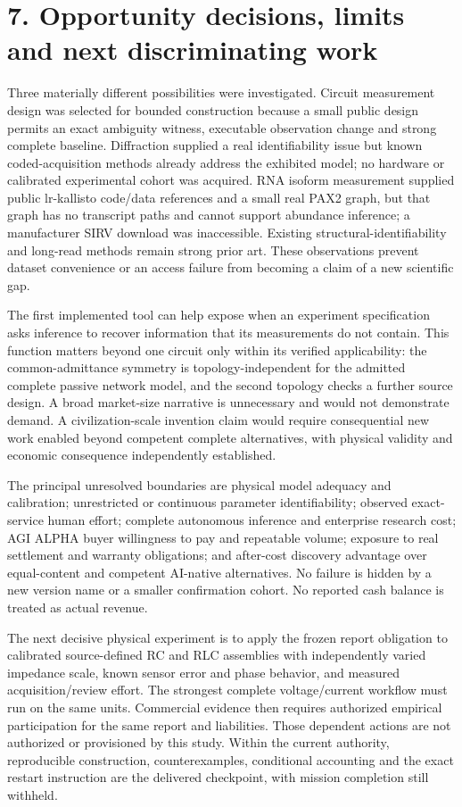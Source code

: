 \documentclass[10pt,letterpaper]{article}
\begin{document}
\section*{\color{accent}7. Opportunity decisions, limits and next discriminating work}
Three materially different possibilities were investigated. Circuit measurement design was selected for bounded construction because a small public design permits an exact ambiguity witness, executable observation change and strong complete baseline. Diffraction supplied a real identifiability issue but known coded-acquisition methods already address the exhibited model; no hardware or calibrated experimental cohort was acquired. RNA isoform measurement supplied public lr-kallisto code/data references and a small real PAX2 graph, but that graph has no transcript paths and cannot support abundance inference; a manufacturer SIRV download was inaccessible. Existing structural-identifiability and long-read methods remain strong prior art. These observations prevent dataset convenience or an access failure from becoming a claim of a new scientific gap.\par
The first implemented tool can help expose when an experiment specification asks inference to recover information that its measurements do not contain. This function matters beyond one circuit only within its verified applicability: the common-admittance symmetry is topology-independent for the admitted complete passive network model, and the second topology checks a further source design. A broad market-size narrative is unnecessary and would not demonstrate demand. A civilization-scale invention claim would require consequential new work enabled beyond competent complete alternatives, with physical validity and economic consequence independently established.\par
The principal unresolved boundaries are physical model adequacy and calibration; unrestricted or continuous parameter identifiability; observed exact-service human effort; complete autonomous inference and enterprise research cost; AGI ALPHA buyer willingness to pay and repeatable volume; exposure to real settlement and warranty obligations; and after-cost discovery advantage over equal-content and competent AI-native alternatives. No failure is hidden by a new version name or a smaller confirmation cohort. No reported cash balance is treated as actual revenue.\par
The next decisive physical experiment is to apply the frozen report obligation to calibrated source-defined RC and RLC assemblies with independently varied impedance scale, known sensor error and phase behavior, and measured acquisition/review effort. The strongest complete voltage/current workflow must run on the same units. Commercial evidence then requires authorized empirical participation for the same report and liabilities. Those dependent actions are not authorized or provisioned by this study. Within the current authority, reproducible construction, counterexamples, conditional accounting and the exact restart instruction are the delivered checkpoint, with mission completion still withheld.\par
\end{document}
